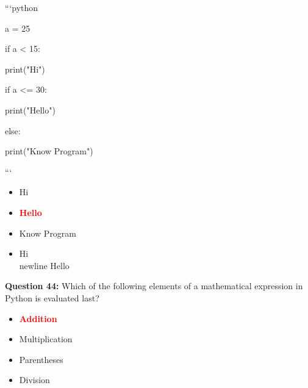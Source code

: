 \documentclass[12pt,a4paper]{article}
\begin{document}
\newline
\newline

\newline
```python\newline

\newline
a = 25\newline

\newline
if a < 15:\newline

\newline
    print("Hi")\newline

\newline
if a <= 30:\newline

\newline
    print("Hello")\newline

\newline
else:\newline

\newline
    print("Know Program")\newline

\newline
```

\begin{itemize}
    \item[\textbf{A.}] Hi
    \item[\textbf{B.}] \textcolor{red}{\textbf{Hello}}
    \item[\textbf{C.}] Know Program
    \item[\textbf{D.}] Hi\\newline Hello
\end{itemize}

\vspace{0.5cm}

\textbf{Question 44:} Which of the following elements of a mathematical expression in Python is evaluated last?

\begin{itemize}
    \item[\textbf{A.}] \textcolor{red}{\textbf{Addition}}
    \item[\textbf{B.}] Multiplication
    \item[\textbf{C.}] Parentheses
    \item[\textbf{D.}] Division
\end{itemize}
\end{document}
